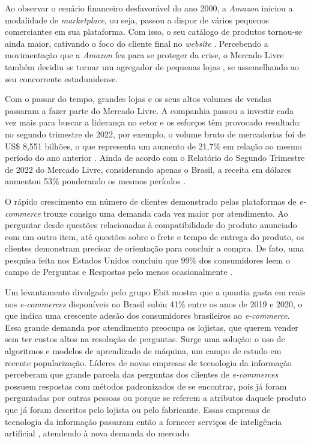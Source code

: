 Ao observar o cenário financeiro desfavorável do ano 2000, a \textit{Amazon} iniciou a modalidade de \textit{marketplace}, ou seja, passou a dispor de vários pequenos comerciantes em sua plataforma. Com isso, o seu catálogo de produtos tornou-se ainda maior, cativando o foco do cliente final no \textit{website} \cite{loja_de_tudo}. Percebendo a movimentação que a \textit{Amazon} fez para se proteger da crise, o Mercado Livre também decidiu se tornar um agregador de pequenas lojas \cite{manual_usuario}, se assemelhando ao seu concorrente estadunidense.

Com o passar do tempo, grandes lojas e os seus altos volumes de vendas passaram a fazer parte do Mercado Livre. A companhia passou a investir cada vez mais para buscar a liderança no setor e os esforços têm provocado resultado: no segundo trimestre de 2022, por exemplo, o volume bruto de mercadorias foi de US\$ 8,551 bilhões, o que representa um aumento de 21,7\% em relação ao mesmo período do ano anterior \cite{ml_report}. Ainda de acordo com o Relatório do Segundo Trimestre de 2022 do Mercado Livre, considerando apenas o Brasil, a receita em dólares aumentou 53\% ponderando os mesmos períodos \cite{ml_report}.

O rápido crescimento em número de clientes demonstrado pelas plataformas de \textit{e-commerce} trouxe consigo uma demanda cada vez maior por atendimento. Ao perguntar desde questões relacionadas à compatibilidade do produto anunciado com um outro item, até questões sobre o frete e tempo de entrega do produto, os clientes demonstram precisar de orientação para concluir a compra. De fato, uma pesquisa feita nos Estados Unidos concluiu que 99\% dos consumidores leem o campo de Perguntas e Respostas pelo menos ocasionalmente \cite{qna_survey}.

Um levantamento divulgado pelo grupo Ebit \cite{ebit} mostra que a quantia gasta em reais nos \textit{e-commerces} disponíveis no Brasil subiu 41\% entre os anos de 2019 e 2020, o que indica uma crescente adesão dos consumidores brasileiros ao \textit{e-commerce}. Essa grande demanda por atendimento preocupa os lojistas, que querem vender sem ter custos altos na resolução de perguntas. Surge uma solução: o uso de algoritmos e modelos de aprendizado de máquina, um campo de estudo em recente popularização. Líderes de novas empresas de tecnologia da informação perceberam que grande parcela das perguntas dos clientes de \textit{e-commerces} possuem respostas com métodos padronizados de se encontrar, pois já foram perguntadas por outras pessoas ou porque se referem a atributos daquele produto que já foram descritos pelo lojista ou pelo fabricante. Essas empresas de tecnologia da informação passaram então a fornecer serviços de inteligência artificial \cite{ai_in_ecommerce}, atendendo à nova demanda do mercado.

